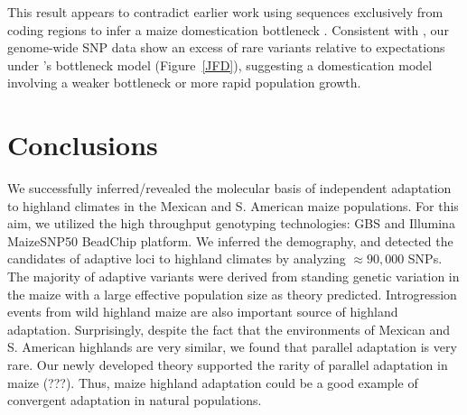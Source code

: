 This result appears to contradict earlier work using sequences exclusively from coding regions to infer a maize domestication bottleneck \cite[]{Eyre-Walker_1998_9539756,Tenaillon_2004_15014173,Wright_2005_15919994}.  
Consistent with \citet{Hufford_2012_22660546}, our genome-wide SNP data show an excess of rare variants relative to expectations under \cite{Wright_2005_15919994}'s bottleneck model (Figure~\ref{JFD}), suggesting a domestication model involving a weaker bottleneck or more rapid population growth.

\section*{Conclusions} 
We successfully inferred/revealed the molecular basis of independent adaptation to highland climates in the Mexican and S. American maize populations.
For this aim, we utilized the high throughput genotyping technologies: GBS and Illumina MaizeSNP50 BeadChip platform.
We inferred the demography, and detected the candidates of adaptive loci to highland climates by analyzing $\approx 90,000$ SNPs.
The majority of adaptive variants were derived from standing genetic variation in the maize with a large effective population size as theory predicted.
Introgression events from wild highland maize are also important source of highland adaptation.
Surprisingly, despite the fact that the environments of Mexican and S. American highlands are very similar, we found that parallel adaptation is very rare. 
Our newly developed theory supported the rarity of parallel adaptation in maize (???).
Thus, maize highland adaptation could be a good example of convergent adaptation in natural populations.




